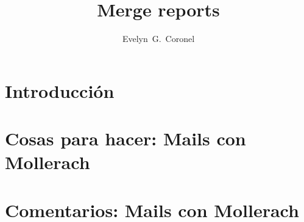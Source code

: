 \documentclass{ibtesis}
\title{Merge reports}
\author{Evelyn~G.~Coronel}
\begin{document}
\chapter{Introducción}
\graphicspath{{report_0_Introduccion/}}


% 

% 

% 

% 

% 

% 



\appendix
\chapter{Cosas para hacer:  Mails con Mollerach}



\chapter{Comentarios:  Mails con Mollerach}




\begin{biblio}
	
\end{biblio}
\end{document}
